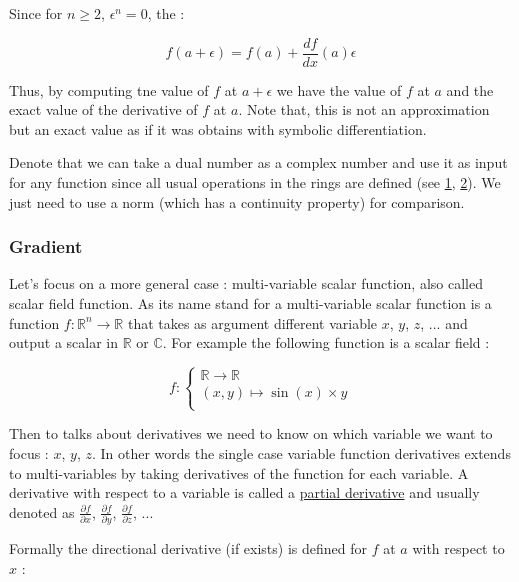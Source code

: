 \documentclass[12pt]{article}
\begin{document}
Since for $n \geq 2$, $\epsilon^n = 0$, the :

$$
f(a+\epsilon) = f(a) + \frac{df}{dx}(a) \epsilon
$$

Thus, by computing tne value of $f$ at $a+\epsilon$ we have the value of $f$ at $a$ and the exact value of the derivative of $f$ at $a$. Note that, this is not an approximation but an exact value as if it was obtains with symbolic differentiation.

Denote that we can take a dual number as a complex number and use it as input for any function since all usual operations in the rings are defined (see \href{ttps://math.stackexchange.com/questions/464262/why-is-there-never-a-proof-that-extending-the-reals-to-the-complex-numbers-will}{1}, \href{https://www.arctbds.com/volume4/arctbds_submission_28.pdf}{2}). We just need to use a norm (which has a continuity property) for comparison.

\subsubsection{Gradient}

Let's focus on a more general case : multi-variable scalar function, also called scalar field function. As its name stand for a multi-variable scalar function is a function $f : \mathbb{R}^n \rightarrow \mathbb{R}$ that takes as argument different variable $x$, $y$, $z$, ... and output a scalar in $\mathbb{R}$ or $\mathbb{C}$. For example the following function is a scalar field :

$$
f : 
\begin{cases}
\mathbb{R} \rightarrow \mathbb{R} \\
(x, y) \mapsto \sin(x) \times y \\
\end{cases}
$$

Then to talks about derivatives we need to know on which variable we want to focus : $x$, $y$, $z$. In other words the single case variable function derivatives extends to multi-variables by taking derivatives of the function for each variable. A derivative with respect to a variable is called a \href{https://en.wikipedia.org/wiki/Partial_derivative}{partial derivative} and usually denoted as $\frac{\partial{f}}{\partial{x}}$, $\frac{\partial{f}}{\partial{y}}$, $\frac{\partial{f}}{\partial{z}}$, ...

Formally the directional derivative (if exists) is defined for $f$ at $a$ with respect to $x$ :
\end{document}
